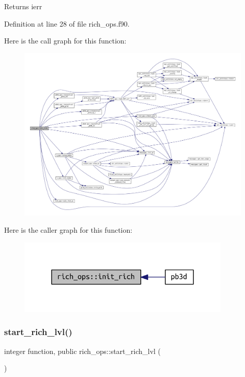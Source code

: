 \begin{DoxyReturn}{Returns}
ierr 
\end{DoxyReturn}


Definition at line 28 of file rich\+\_\+ops.\+f90.

Here is the call graph for this function\+:\nopagebreak
\begin{figure}[H]
\begin{center}
\leavevmode
\includegraphics[width=350pt]{namespacerich__ops_a9fbbda93eab8973d33063e277c489e7b_cgraph}
\end{center}
\end{figure}
Here is the caller graph for this function\+:\nopagebreak
\begin{figure}[H]
\begin{center}
\leavevmode
\includegraphics[width=288pt]{namespacerich__ops_a9fbbda93eab8973d33063e277c489e7b_icgraph}
\end{center}
\end{figure}
\mbox{\label{namespacerich__ops_a97206a15127960366fcb41d6889cb3b5}} 
\subsubsection{\texorpdfstring{start\+\_\+rich\+\_\+lvl()}{start\_rich\_lvl()}}
{\footnotesize\ttfamily integer function, public rich\+\_\+ops\+::start\+\_\+rich\+\_\+lvl (\begin{DoxyParamCaption}{ }\end{DoxyParamCaption})}



